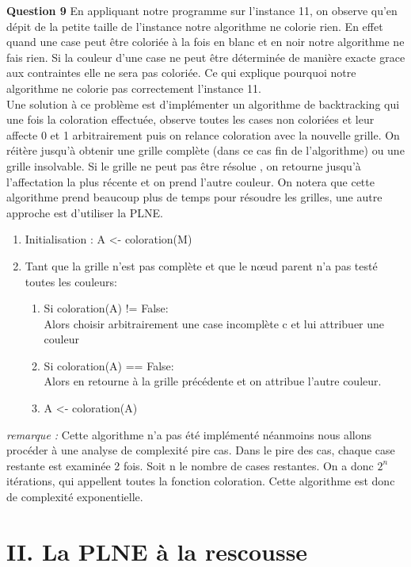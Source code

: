\documentclass[a4paper]{memoir}
\begin{document}
\textbf{Question 9} En appliquant notre programme sur l'instance 11, on observe qu'en dépit de la petite taille de l'instance notre algorithme ne colorie rien. En effet quand une case peut être coloriée à la fois en blanc et en noir notre algorithme ne fais rien. Si la couleur d'une case ne peut être déterminée de manière exacte grace aux contraintes elle ne sera pas coloriée. Ce qui explique pourquoi notre algorithme ne colorie pas correctement l'instance 11.
\\
Une solution à ce problème est d'implémenter un algorithme de backtracking qui une fois la coloration effectuée, observe toutes les cases non coloriées et leur affecte 0 et 1 arbitrairement puis on relance coloration avec la nouvelle grille. On réitère jusqu'à obtenir une grille complète (dans ce cas fin de l'algorithme) ou une grille insolvable. Si le grille ne peut pas être résolue , on retourne jusqu'à l'affectation la plus récente et on prend l'autre couleur. On notera que cette algorithme prend beaucoup plus de temps pour résoudre les grilles, une autre approche est d'utiliser la PLNE.\\
\begin{enumerate}
\item Initialisation : A <- coloration(M) 
\item Tant que la grille n'est pas complète et que le nœud parent n'a pas testé toutes les couleurs:
  \begin{enumerate}
    \item Si coloration(A) != False:\\
      Alors choisir arbitrairement une case incomplète c et lui attribuer une couleur
    \item Si coloration(A) == False:\\
      Alors en retourne à la grille précédente et on attribue l'autre couleur.
    \item  A <- coloration(A)
  \end{enumerate}
\end{enumerate}
\textit{remarque : } Cette algorithme n'a pas été implémenté néanmoins nous allons procéder à une analyse de complexité pire cas. Dans le pire des cas, chaque case restante est examinée 2 fois. Soit n le nombre de cases restantes. On a donc $2^n $ itérations, qui appellent toutes la fonction coloration. Cette algorithme est donc de complexité exponentielle.



 	
 	\newpage
 	\section{II. La PLNE à la rescousse}
\end{document}
